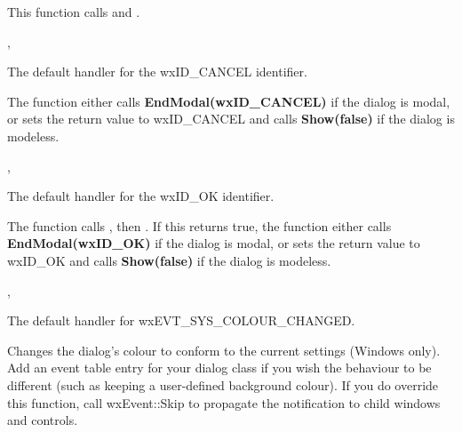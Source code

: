 This function calls  and .


, 


\label{wxdialogoncancel}


The default handler for the wxID\_CANCEL identifier.


The function either calls {\bf EndModal(wxID\_CANCEL)} if the dialog is modal, or
sets the return value to wxID\_CANCEL and calls {\bf Show(false)} if the dialog is modeless.


, 


\label{wxdialogonok}


The default handler for the wxID\_OK identifier.


The function calls
\rtfsp{}, then .
If this returns true, the function either calls {\bf EndModal(wxID\_OK)} if the dialog is modal, or
sets the return value to wxID\_OK and calls {\bf Show(false)} if the dialog is modeless.


, 


\label{wxdialogonsyscolourchanged}


The default handler for wxEVT\_SYS\_COLOUR\_CHANGED.




Changes the dialog's colour to conform to the current settings (Windows only).
Add an event table entry for your dialog class if you wish the behaviour
to be different (such as keeping a user-defined
background colour). If you do override this function, call wxEvent::Skip to
propagate the notification to child windows and controls.

